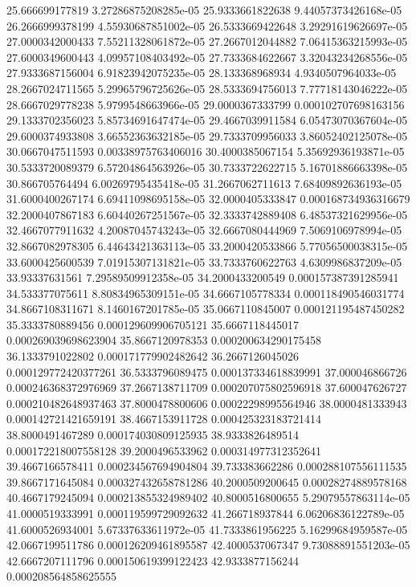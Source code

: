 {25.666699177819 3.27286875208285e-05
25.9333661822638 9.44057373426168e-05
26.2666999378199 4.55930687851002e-05
26.5333669422648 3.29291619626697e-05
27.0000342000433 7.55211328061872e-05
27.2667012044882 7.06415363215993e-05
27.6000349600443 4.09957108403492e-05
27.7333684622667 3.32043234268556e-05
27.9333687156004 6.91823942075235e-05
28.133368968934 4.9340507964033e-05
28.2667024711565 5.29965796725626e-05
28.5333694756013 7.77718143046222e-05
28.6667029778238 5.9799548663966e-05
29.0000367333799 0.000102707698163156
29.1333702356023 5.85734691647474e-05
29.4667039911584 6.05473070367604e-05
29.6000374933808 3.66552363632185e-05
29.7333709956033 3.86052402125078e-05
30.0667047511593 0.00338975763406016
30.4000385067154 5.35692936193871e-05
30.5333720089379 6.57204864563926e-05
30.7333722622715 5.16701886663398e-05
30.866705764494 6.00269795435418e-05
31.2667062711613 7.68409892636193e-05
31.6000400267174 6.69411098695158e-05
32.0000405333847 0.000168734936316679
32.2000407867183 6.60440267251567e-05
32.3333742889408 6.48537321629956e-05
32.4667077911632 4.20087045743243e-05
32.6667080444969 7.5069106978994e-05
32.8667082978305 6.44643421363113e-05
33.2000420533866 5.77056500038315e-05
33.6000425600539 7.01915307131821e-05
33.7333760622763 4.6309986837209e-05
33.93337631561 7.29589509912358e-05
34.2000433200549 0.000157387391285941
34.533377075611 8.80834965309151e-05
34.6667105778334 0.000118490546031774
34.8667108311671 8.1460167201785e-05
35.0667110845007 0.000121195487450282
35.3333780889456 0.000129609906705121
35.6667118445017 0.000269039698623904
35.8667120978353 0.000200634290175458
36.1333791022802 0.000171779902482642
36.2667126045026 0.000129772420377261
36.5333796089475 0.000137334618839991
37.000046866726 0.000246368372976969
37.2667138711709 0.000207075802596918
37.600047626727 0.000210482648937463
37.8000478800606 0.00022298995564946
38.0000481333943 0.000142721421659191
38.4667153911728 0.000425323183721414
38.8000491467289 0.000174030809125935
38.9333826489514 0.000172218007558128
39.2000496533962 0.000314977312352641
39.4667166578411 0.000234567694904804
39.733383662286 0.000288107556111535
39.8667171645084 0.000327432658781286
40.2000509200645 0.00028274889578168
40.4667179245094 0.000213855324989402
40.8000516800655 5.29079557863114e-05
41.0000519333991 0.000119599729092632
41.266718937844 6.06206836122789e-05
41.6000526934001 5.67337633611972e-05
41.7333861956225 5.16299684959587e-05
42.0667199511786 0.000126209461895587
42.4000537067347 9.73088891551203e-05
42.6667207111796 0.000150619399122423
42.9333877156244 0.000208564858625555
}
